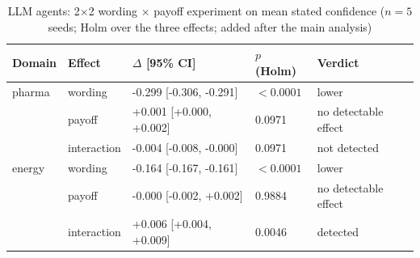 \begin{table}[t]
\caption{LLM agents: 2$\times$2 wording $\times$ payoff experiment on mean stated confidence ($n=5$ seeds; Holm over the three effects; added after the main analysis)}\label{tab:llm}
\footnotesize
\begin{tabular}{@{}lllll@{}}
\toprule
Domain & Effect & $\Delta$ [95\% CI] & $p$ (Holm) & Verdict \\
\midrule
pharma & wording & -0.299 [-0.306, -0.291] & $<0.0001$ & lower \\
 & payoff & +0.001 [+0.000, +0.002] & 0.0971 & no detectable effect \\
 & interaction & -0.004 [-0.008, -0.000] & 0.0971 & not detected \\
energy & wording & -0.164 [-0.167, -0.161] & $<0.0001$ & lower \\
 & payoff & -0.000 [-0.002, +0.002] & 0.9884 & no detectable effect \\
 & interaction & +0.006 [+0.004, +0.009] & 0.0046 & detected \\
\bottomrule
\end{tabular}
\end{table}
